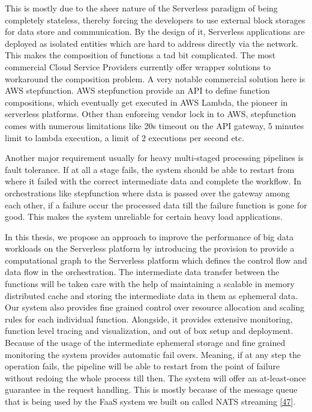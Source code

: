\documentclass[12pt,titlepage]{article}
\begin{document}
This is mostly due to the sheer
nature of the Serverless paradigm of being completely stateless, thereby forcing
the developers to use external block storages for data store and communication.
By the design of it, Serverless applications are deployed as isolated entities
which are hard to address directly via the network. This makes the composition
of functions a tad bit complicated. The most commercial Cloud Service Providers
currently offer wrapper solutions to workaround the composition problem. A very
notable commercial solution here is AWS stepfunction. AWS stepfunction provide
an API to define function compositions, which eventually get executed in AWS
Lambda, the pioneer in serverless platforms. Other than enforcing vendor lock in
to AWS, stepfunction comes with numerous limitations like 20s timeout on the API
gateway, 5 minutes limit to lambda execution, a limit of 2 executions per second
etc.

Another major requirement usually for heavy multi-staged processing pipelines is fault
tolerance. If at all a stage fails, the system should be able to restart from
where it failed with the correct intermediate data and complete the workflow. In
orchestrations like stepfunction where data is passed over the gateway among
each other, if a failure occur the processed data till the failure function is
gone for good. This makes the system unreliable for certain heavy load applications.

In this thesis, we propose an approach to improve the performance of big data workloads
on the Serverless platform by introducing the provision to provide a
computational graph to the Serverless platform which defines the control flow
and data flow in the orchestration. The intermediate data transfer between the
functions will be taken care with the help of maintaining a scalable in memory
distributed cache and storing the intermediate data in them as ephemeral data.
Our system also provides fine grained control over resource allocation and
scaling rules for each individual function. Alongside, it provides extensive
monitoring, function level tracing and visualization, and out of box setup and
deployment. Because of the usage of the intermediate ephemeral storage and fine
grained monitoring the system provides automatic fail overs. Meaning, if at any
step the operation fails, the pipeline will be able to
restart from the point of failure without redoing the whole process till then.
The system will offer an at-least-once guarantee in the request handling. This
is mostly because of the message queue that is being used by the FaaS system we
built on called NATS streaming \hyperref[ref:47]{[47}]. 
\end{document}
